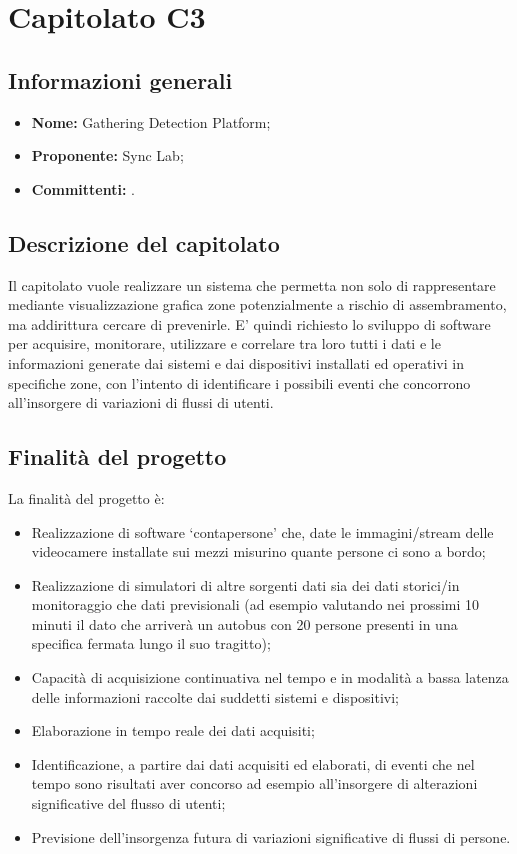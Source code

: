 \section{Capitolato C3}

\subsection{Informazioni generali}
\begin{itemize}
\item \textbf{Nome:}  Gathering Detection Platform;
\item \textbf{Proponente:} Sync Lab;
\item \textbf{Committenti:} \committenti{}.
\end{itemize}

\subsection{Descrizione del capitolato}
Il capitolato vuole realizzare un sistema che permetta non solo di rappresentare mediante visualizzazione grafica zone potenzialmente a rischio di assembramento, ma addirittura cercare di prevenirle. E' quindi richiesto lo sviluppo di software per acquisire, monitorare, utilizzare e correlare tra loro tutti i dati e le informazioni generate dai sistemi e dai dispositivi installati ed operativi in specifiche zone, con l'intento di identificare i possibili eventi che concorrono all'insorgere di variazioni di flussi di utenti. 
\subsection{Finalità del progetto}
La finalità del progetto è:
\begin{itemize}
\item Realizzazione di software ‘contapersone’ che, date le immagini/stream delle videocamere installate sui mezzi misurino quante persone ci sono a bordo;
\item Realizzazione di simulatori di altre sorgenti dati sia dei dati storici/in monitoraggio che dati previsionali
(ad esempio valutando nei prossimi 10 minuti il dato che arriverà un autobus con 20 persone presenti
in una specifica fermata lungo il suo tragitto);
\item Capacità di acquisizione continuativa nel tempo e in modalità a bassa latenza delle informazioni
raccolte dai suddetti sistemi e dispositivi;
\item Elaborazione in tempo reale dei dati acquisiti;
\item Identificazione, a partire dai dati acquisiti ed elaborati, di eventi che nel tempo sono risultati aver
concorso ad esempio all'insorgere di alterazioni significative del flusso di utenti;
\item Previsione dell'insorgenza futura di variazioni significative di flussi di persone.
\end{itemize}


